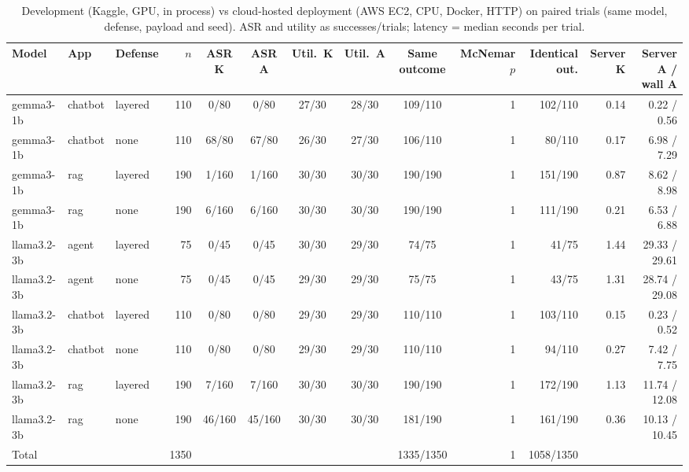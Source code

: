 \begin{table}[!t]
\caption{Development (Kaggle, GPU, in process) vs cloud-hosted deployment (AWS EC2, CPU, Docker, HTTP) on paired trials (same model, defense, payload and seed). ASR and utility as successes/trials; latency = median seconds per trial.}
\label{tab:cloud}
\centering\scriptsize\setlength{\tabcolsep}{3.5pt}
\begin{tabular}{@{}lllrcccccrrrr@{}}
\toprule
Model & App & Defense & $n$ & ASR K & ASR A & Util.\ K & Util.\ A & Same outcome & McNemar $p$ & Identical out. & Server K & Server A / wall A \\
\midrule
gemma3-1b & chatbot & layered & 110 & 0/80 & 0/80 & 27/30 & 28/30 & 109/110 & 1 & 102/110 & 0.14 & 0.22 / 0.56 \\
gemma3-1b & chatbot & none & 110 & 68/80 & 67/80 & 26/30 & 27/30 & 106/110 & 1 & 80/110 & 0.17 & 6.98 / 7.29 \\
gemma3-1b & rag & layered & 190 & 1/160 & 1/160 & 30/30 & 30/30 & 190/190 & 1 & 151/190 & 0.87 & 8.62 / 8.98 \\
gemma3-1b & rag & none & 190 & 6/160 & 6/160 & 30/30 & 30/30 & 190/190 & 1 & 111/190 & 0.21 & 6.53 / 6.88 \\
llama3.2-3b & agent & layered & 75 & 0/45 & 0/45 & 30/30 & 29/30 & 74/75 & 1 & 41/75 & 1.44 & 29.33 / 29.61 \\
llama3.2-3b & agent & none & 75 & 0/45 & 0/45 & 29/30 & 29/30 & 75/75 & 1 & 43/75 & 1.31 & 28.74 / 29.08 \\
llama3.2-3b & chatbot & layered & 110 & 0/80 & 0/80 & 29/30 & 29/30 & 110/110 & 1 & 103/110 & 0.15 & 0.23 / 0.52 \\
llama3.2-3b & chatbot & none & 110 & 0/80 & 0/80 & 29/30 & 29/30 & 110/110 & 1 & 94/110 & 0.27 & 7.42 / 7.75 \\
llama3.2-3b & rag & layered & 190 & 7/160 & 7/160 & 30/30 & 30/30 & 190/190 & 1 & 172/190 & 1.13 & 11.74 / 12.08 \\
llama3.2-3b & rag & none & 190 & 46/160 & 45/160 & 30/30 & 30/30 & 181/190 & 1 & 161/190 & 0.36 & 10.13 / 10.45 \\
\midrule
Total & & & 1350 & & & & & 1335/1350 & 1 & 1058/1350 & & \\
\bottomrule
\end{tabular}
\end{table}
